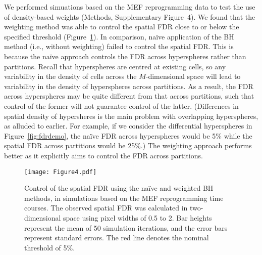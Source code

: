 \documentclass{article}
\newcommand{\suppfigfdr}{4}
\begin{document}
We performed simuations based on the MEF reprogramming data to test the use of density-based weights (Methods, Supplementary Figure~\suppfigfdr{}).
We found that the weighting method was able to control the spatial FDR close to or below the specified threshold (Figure~\ref{fig:fdr}).
In comparison, na\"ive application of the BH method (i.e., without weighting) failed to control the spatial FDR.
This is because the na\"ive approach controls the FDR across hyperspheres rather than partitions.
Recall that hyperspheres are centred at existing cells, so any variability in the density of cells across the $M$-dimensional space will lead to variability in the density of hyperspheres across partitions.
As a result, the FDR across hyperspheres may be quite different from that across partitions, such that control of the former will not guarantee control of the latter.
(Differences in spatial density of hypersheres is the main problem with overlapping hyperspheres, as alluded to earlier.
For example, if we consider the differential hyperspheres in Figure~\ref{fig:fdrdemo}, the na\"ive FDR across hyperspheres would be 5\% while the spatial FDR across partitions would be 25\%.)
The weighting approach performs better as it explicitly aims to control the FDR across partitions.

\begin{figure}[bt]
\begin{center}
\texttt{[image: Figure4.pdf]}
\end{center}
\caption{
    Control of the spatial FDR using the na\"ive and weighted BH methods, in simulations based on the MEF reprogramming time courses.
    The observed spatial FDR was calculated in two-dimensional space using pixel widths of 0.5 to 2.
    Bar heights represent the mean of 50 simulation iterations, and the error bars represent standard errors.
    The red line denotes the nominal threshold of 5\%.
}
\label{fig:fdr}
\end{figure}

\end{document}
